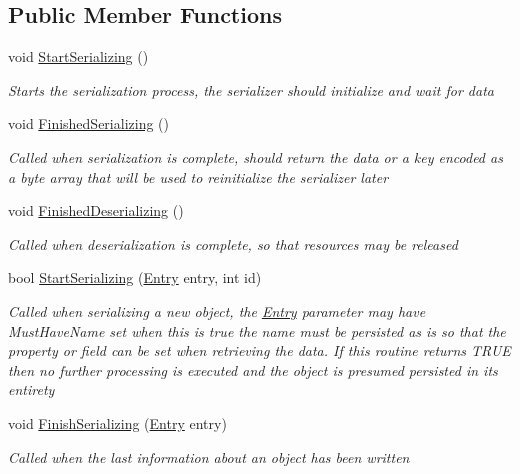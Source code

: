 \subsection*{Public Member Functions}
\begin{DoxyCompactItemize}
\item 
void \hyperlink{interface_serialization_1_1_i_storage_a0f040f49872c3bf4ba92a350494e45af}{Start\+Serializing} ()
\begin{DoxyCompactList}\small\item\em Starts the serialization process, the serializer should initialize and wait for data \end{DoxyCompactList}\item 
void \hyperlink{interface_serialization_1_1_i_storage_a5a9811117c5fba81ff98854cfa2c48e1}{Finished\+Serializing} ()
\begin{DoxyCompactList}\small\item\em Called when serialization is complete, should return the data or a key encoded as a byte array that will be used to reinitialize the serializer later \end{DoxyCompactList}\item 
void \hyperlink{interface_serialization_1_1_i_storage_affc5c4e5bc5efaf0f1840943358b6bc9}{Finished\+Deserializing} ()
\begin{DoxyCompactList}\small\item\em Called when deserialization is complete, so that resources may be released \end{DoxyCompactList}\item 
bool \hyperlink{interface_serialization_1_1_i_storage_a62f447c10caea0bd0c2ec3bad36fe14a}{Start\+Serializing} (\hyperlink{class_serialization_1_1_entry}{Entry} entry, int id)
\begin{DoxyCompactList}\small\item\em Called when serializing a new object, the \hyperlink{class_serialization_1_1_entry}{Entry} parameter may have Must\+Have\+Name set when this is true the name must be persisted as is so that the property or field can be set when retrieving the data. If this routine returns T\+R\+UE then no further processing is executed and the object is presumed persisted in its entirety \end{DoxyCompactList}\item 
void \hyperlink{interface_serialization_1_1_i_storage_a03e6828bebedaa8ec17e5f01a7cbd689}{Finish\+Serializing} (\hyperlink{class_serialization_1_1_entry}{Entry} entry)
\begin{DoxyCompactList}\small\item\em Called when the last information about an object has been written \end{DoxyCompactList}\item 

\end{DoxyCompactItemize}
